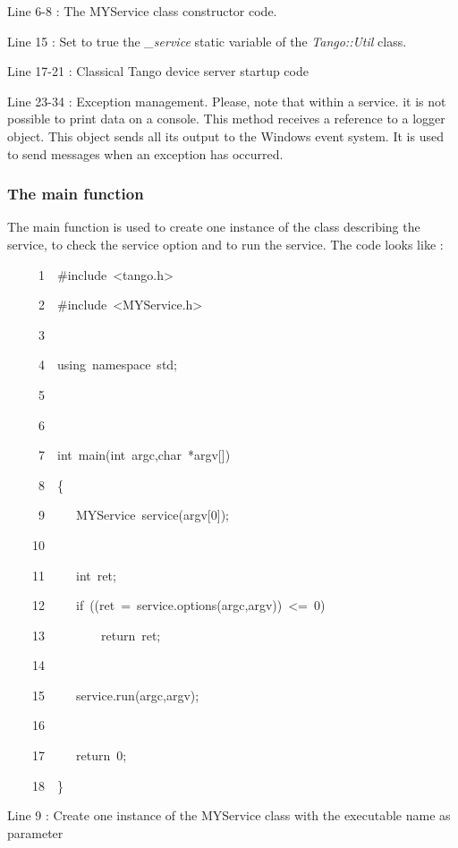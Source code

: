 

Line 6-8 : The MYService class constructor code.

Line 15 : Set to true the \emph{\_service} static variable of the
\emph{Tango::Util} class.

Line 17-21 : Classical Tango device server startup code

Line 23-34 : Exception management. Please, note that within a service.
it is not possible to print data on a console. This method receives
a reference to a logger object. This object sends all
its output to the Windows event system. It is used to
send messages when an exception has occurred.

\subsubsection{The main function}

The main function is used to create one instance of the class describing
the service, to check the service option and to run the service. The
code looks like :


\begin{lyxcode}
~~~~~1~~\#include~<tango.h>

~~~~~2~~\#include~<MYService.h>

~~~~~3~~

~~~~~4~~using~namespace~std;

~~~~~5~~

~~~~~6~~

~~~~~7~~int~main(int~argc,char~{*}argv{[}{]})

~~~~~8~~\{

~~~~~9~~~~~MYService~service(argv{[}0{]});

~~~~10~~~~~~~~~~

~~~~11~~~~~int~ret;

~~~~12~~~~~if~((ret~=~service.options(argc,argv))~<=~0)

~~~~13~~~~~~~~~return~ret;

~~~~14~~~~~~~~~~

~~~~15~~~~~service.run(argc,argv);

~~~~16~~~~~~~~~~

~~~~17~~~~~return~0;

~~~~18~~\}
\end{lyxcode}


Line 9 : Create one instance of the MYService class with the executable
name as parameter

